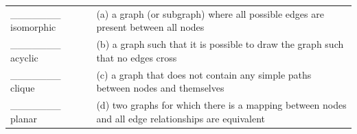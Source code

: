 \documentclass[11pt, oneside]{article}   	%
\begin{document}
\begin{enumerate}
\begin{center}
\begin{tabular}{lp{4in}}
\_\_\_\_\_\_\_ isomorphic & (a) a graph (or subgraph) where all possible edges are present between all nodes\\
\_\_\_\_\_\_\_ acyclic & (b) a graph such that it is possible to draw the graph such that no edges cross\\
\_\_\_\_\_\_\_ clique & (c) a graph that does not contain any simple paths between nodes and themselves\\
\_\_\_\_\_\_\_ planar & (d) two graphs for which there is a mapping between nodes and all edge relationships are equivalent \\

\end{tabular}
\end{center}

\end{enumerate}
\end{document}
